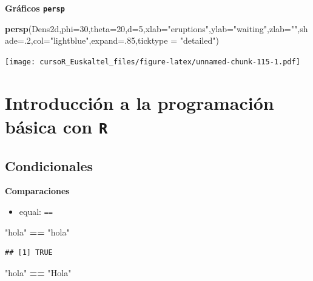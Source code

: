 \documentclass[]{book}
\newenvironment{Shaded}{\begin{snugshade}}{\end{snugshade}}
\newcommand{\KeywordTok}[1]{\textcolor[rgb]{0.13,0.29,0.53}{\textbf{#1}}}
\newcommand{\DataTypeTok}[1]{\textcolor[rgb]{0.13,0.29,0.53}{#1}}
\newcommand{\DecValTok}[1]{\textcolor[rgb]{0.00,0.00,0.81}{#1}}
\newcommand{\StringTok}[1]{\textcolor[rgb]{0.31,0.60,0.02}{#1}}
\newcommand{\OperatorTok}[1]{\textcolor[rgb]{0.81,0.36,0.00}{\textbf{#1}}}
\newcommand{\NormalTok}[1]{#1}
\providecommand{\tightlist}{%
  \setlength{\itemsep}{0pt}\setlength{\parskip}{0pt}}
\begin{document}
\textbf{Gráficos \texttt{persp}}

\begin{Shaded}
\begin{Highlighting}[]
\KeywordTok{persp}\NormalTok{(Dens2d,}\DataTypeTok{phi=}\DecValTok{30}\NormalTok{,}\DataTypeTok{theta=}\DecValTok{20}\NormalTok{,}\DataTypeTok{d=}\DecValTok{5}\NormalTok{,}\DataTypeTok{xlab=}\StringTok{"eruptions"}\NormalTok{,}\DataTypeTok{ylab=}\StringTok{"waiting"}\NormalTok{,}\DataTypeTok{zlab=}\StringTok{""}\NormalTok{,}\DataTypeTok{shade=}\NormalTok{.}\DecValTok{2}\NormalTok{,}\DataTypeTok{col=}\StringTok{"lightblue"}\NormalTok{,}\DataTypeTok{expand=}\NormalTok{.}\DecValTok{85}\NormalTok{,}\DataTypeTok{ticktype =} \StringTok{"detailed"}\NormalTok{)}
\end{Highlighting}
\end{Shaded}

\texttt{[image: cursoR\_Euskaltel\_files/figure-latex/unnamed-chunk-115-1.pdf]}

\chapter{\texorpdfstring{Introducción a la programación básica con
\texttt{R}}{Introducción a la programación básica con R}}\label{introduccion-a-la-programacion-basica-con-r}

\section{Condicionales}\label{condicionales}

\textbf{Comparaciones}

\begin{itemize}
\tightlist
\item
  equal: \texttt{==}
\end{itemize}

\begin{Shaded}
\begin{Highlighting}[]
  \StringTok{"hola"} \OperatorTok{==}\StringTok{ "hola"}
\end{Highlighting}
\end{Shaded}

\begin{verbatim}
## [1] TRUE
\end{verbatim}

\begin{Shaded}
\begin{Highlighting}[]
  \StringTok{"hola"} \OperatorTok{==}\StringTok{ "Hola"}
\end{Highlighting}
\end{Shaded}
\end{document}
